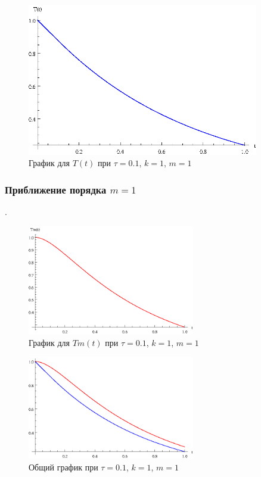 \vfill

\begin{figure}[h]
\begin{center}
\includegraphics[width=0.9\textwidth]{./3_results/1_1.eps}
\end{center}
\caption{График для $T(t)$ при $\tau=0.1$, $k=1$, $m=1$}
\end{figure}

\vfill

\newpage

\subsubsection{Приближение порядка $m=1$}.

\begin{figure}[h]
\begin{center}
\includegraphics[width=0.65\textwidth]{./3_results/1_2.eps}
\end{center}
\caption{График для $Tm(t)$ при $\tau=0.1$, $k=1$, $m=1$}
\end{figure}

\begin{figure}[h]
\begin{center}
\includegraphics[width=0.65\textwidth]{./3_results/1_3.eps}
\end{center}
\caption{Общий график при $\tau=0.1$, $k=1$, $m=1$}
\end{figure}

